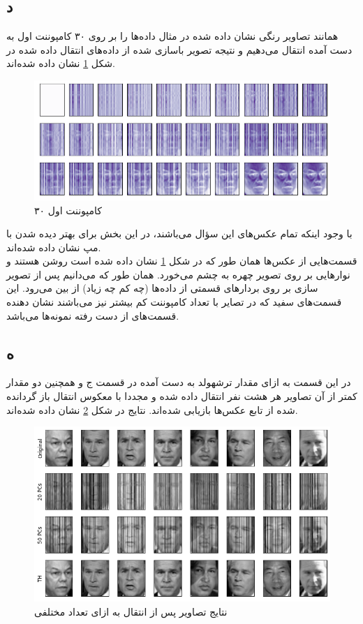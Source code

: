 \documentclass[12pt,onecolumn,a4paper]{article}
\begin{document}
\subsection*{د}
همانند تصاویر رنگی نشان داده شده در مثال داده‌ها را بر روی ۳۰ کامپوننت اول به دست آمده انتقال می‌دهیم و نتیجه تصویر باسازی شده از داده‌های انتقال داده شده در شکل \ref{fig:6} نشان داده شده‌اند.
\begin{figure}[h!]
    \begin{center}
    \includegraphics[scale=0.55]{plots/q8_d.png}
    \caption{۳۰ کامپوننت اول}
    \label{fig:6}
    \end{center}
\end{figure}
با وجود اینکه تمام عکس‌های این سؤال  می‌باشند، در این بخش برای بهتر دیده شدن با مپ  نشان داده شده‌اند.\\
قسمت‌هایی از عکس‌ها همان طور که در شکل \ref{fig:6} نشان داده شده است روشن هستند و نوارهایی بر روی تصویر چهره به چشم می‌خورد. همان طور که می‌دانیم پس از تصویر سازی بر روی بردارهای  قسمتی از داده‌ها (چه کم چه زیاد) از بین می‌رود. این قسمت‌های سفید که در تصایر با تعداد کامپوننت کم بیشتر نیز می‌باشند نشان دهنده قسمت‌های از دست رفته نمونه‌ها می‌باشد.

\subsection*{ه}
در این قسمت به ازای مقدار ترشهولد به دست آمده در قسمت ج و همچنین دو مقدار کمتر از آن تصاویر هر هشت نفر انتقال داده شده و مجددا با معکوس انتقال باز گردانده شده از تابع  عکس‌ها بازیابی شده‌اند. نتایج در شکل \ref{fig:7} نشان داده شده‌اند.
\begin{figure}[h!]
    \begin{center}
    \includegraphics[scale=0.55]{plots/q8_e.png}
    \caption{نتایج  تصاویر پس از انتقال به ازای تعداد مختلفی }
    \label{fig:7}
    \end{center}
\end{figure}
\end{document}
